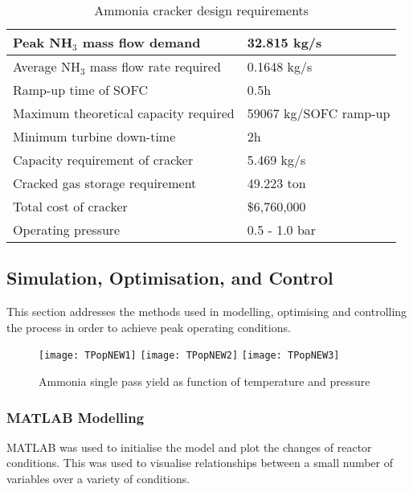 \begin{table}[!htbp]
	\begin{center}
		\caption{Ammonia cracker design requirements}
		\begin{tabular}{ |l|l|  }
			
			\hline
			Peak NH$_3$ mass flow demand & 32.815 kg/s\\
			\hline
			Average NH$_3$ mass flow rate required & 0.1648 kg/s\\
			\hline
			Ramp-up time of SOFC&  0.5h\\
			\hline
			Maximum theoretical capacity required& 59067 kg/SOFC ramp-up\\
			\hline
			Minimum turbine down-time    &2h \\
			\hline
			Capacity requirement of cracker& 5.469 kg/s\\
			\hline
			Cracked gas storage requirement & 49.223 ton \\
			\hline
			Total cost of cracker & \$6,760,000 \\
			\hline
			Operating pressure & 0.5 - 1.0 bar \\
			\hline
		\end{tabular}
	\end{center}
\end{table}


\subsection{Simulation, Optimisation, and Control}
This section addresses the methods used in modelling, optimising and controlling the process in order to achieve peak operating conditions.

{\begin{figure}[!htbp]
			\texttt{[image: TPopNEW1]}	
			\texttt{[image: TPopNEW2]}	
			\texttt{[image: TPopNEW3]}
			\caption{Ammonia single pass yield as function of temperature and pressure}	
\end{figure}}

\subsubsection{MATLAB Modelling}
MATLAB was used to initialise the model and plot the changes of reactor conditions. This was used to visualise relationships between a small number of variables over a variety of conditions.
